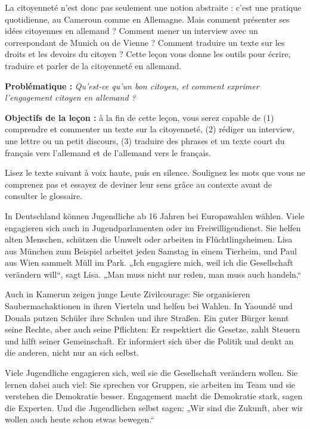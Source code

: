 \documentclass[11pt]{article}
\newcounter{popsec}
\newcounter{popsub}
\newcommand{\courssub}[1]{%
  \stepcounter{popsub}%
  \par\vspace{9pt}\noindent{\popxbold\fontsize{11.5}{13}\selectfont\color{popink}{\color{poporange}\thepopsec.\thepopsub}\hspace{6pt}#1}\par\nopagebreak\vspace{4pt}
}
\begin{document}
La citoyenneté n'est donc pas seulement une notion abstraite : c'est une pratique quotidienne, au Cameroun comme en Allemagne. Mais comment présenter ses idées citoyennes en allemand ? Comment mener un interview avec un correspondant de Munich ou de Vienne ? Comment traduire un texte sur les droits et les devoirs du citoyen ? Cette leçon vous donne les outils pour écrire, traduire et parler de la citoyenneté en allemand.

\textbf{Problématique :} \emph{Qu'est-ce qu'un bon citoyen, et comment exprimer l'engagement citoyen en allemand ?}

\textbf{Objectifs de la leçon :} à la fin de cette leçon, vous serez capable de (1) comprendre et commenter un texte sur la citoyenneté, (2) rédiger un interview, une lettre ou un petit discours, (3) traduire des phrases et un texte court du français vers l'allemand et de l'allemand vers le français.

\courssub{Lecture du texte : Jugendliche engagieren sich}

Lisez le texte suivant à voix haute, puis en silence. Soulignez les mots que vous ne comprenez pas et essayez de deviner leur sens grâce au contexte avant de consulter le glossaire.

\begin{textebox}
In Deutschland können Jugendliche ab 16 Jahren bei Europawahlen wählen. Viele engagieren sich auch in Jugendparlamenten oder im Freiwilligendienst. Sie helfen alten Menschen, schützen die Umwelt oder arbeiten in Flüchtlingsheimen. Lisa aus München zum Beispiel arbeitet jeden Samstag in einem Tierheim, und Paul aus Wien sammelt Müll im Park. „Ich engagiere mich, weil ich die Gesellschaft verändern will“, sagt Lisa. „Man muss nicht nur reden, man muss auch handeln.“

Auch in Kamerun zeigen junge Leute Zivilcourage: Sie organisieren Saubermachaktionen in ihren Vierteln und helfen bei Wahlen. In Yaoundé und Douala putzen Schüler ihre Schulen und ihre Straßen. Ein guter Bürger kennt seine Rechte, aber auch seine Pflichten: Er respektiert die Gesetze, zahlt Steuern und hilft seiner Gemeinschaft. Er informiert sich über die Politik und denkt an die anderen, nicht nur an sich selbst.

Viele Jugendliche engagieren sich, weil sie die Gesellschaft verändern wollen. Sie lernen dabei auch viel: Sie sprechen vor Gruppen, sie arbeiten im Team und sie verstehen die Demokratie besser. Engagement macht die Demokratie stark, sagen die Experten. Und die Jugendlichen selbst sagen: „Wir sind die Zukunft, aber wir wollen auch heute schon etwas bewegen.“
\end{textebox}
\end{document}
